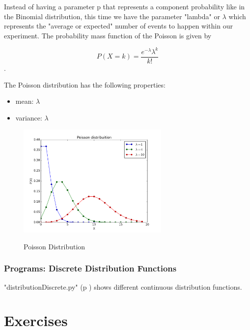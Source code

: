 Instead of having a parameter p that represents a component probability like in the Binomial distribution, this time we have the parameter "lambda" or $\lambda$ which represents the "average or expected" number of events to happen within our experiment. The probability mass function of the Poisson is given by

\begin{equation}
  P(X=k)=\frac{e^{-\lambda}\lambda^k}{k!}
\end{equation}.

The Poisson distribution has the following properties:

\begin{itemize}
    \item mean: $\lambda$
    \item variance: $\lambda$
\end{itemize}

\begin{figure}
  \centering
  \includegraphics[width=0.66\textwidth]{../Images/Poisson_distribution_pmf.png}\\
  \caption{Poisson Distribution}
\end{figure}

\subsubsection{Programs: Discrete Distribution Functions} 

\PyImg "distributionDiscrete.py" (p \pageref{py:discrete}) shows different continuous distribution functions.

\section{Exercises}

